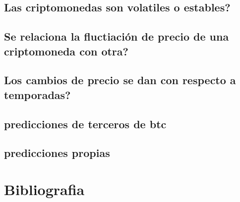 \documentclass[12pt,letterpaper]{article}
\begin{document}
	\subsection*{Las criptomonedas son volatiles o estables?}
	\subsection*{Se relaciona la fluctiaci\'on de precio de una criptomoneda con otra?}
	\subsection*{Los cambios de precio se dan con respecto a temporadas?}
	\subsection*{predicciones de terceros de btc}
	\subsection*{predicciones propias}
	
\section{Bibliografia}
\end{document}
